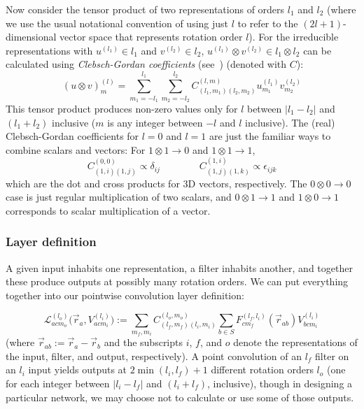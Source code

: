 \documentclass{article}
\begin{document}
Now consider the tensor product of two representations of orders $l_1$ and $l_2$ (where we use the usual notational convention of using just $l$ to refer to the $(2l + 1)$-dimensional vector space that represents rotation order $l$). For the irreducible representations with $u^{(l_1)} \in l_1$ and $v^{(l_2)} \in l_2$, $u^{(l_1)} \otimes v^{(l_2)} \in l_1 \otimes l_2$ can be calculated using {\em Clebsch-Gordan coefficients} (see~\citet{griffiths2016introduction}) (denoted with $C$): 
\[(u \otimes v)^{(l)}_{m} = \sum_{m_1=-l_1}^{l_1} \sum_{m_2=-l_2}^{l_2} C^{(l, m)}_{(l_1, m_1) (l_2, m_2)} u^{(l_1)}_{m_1} v^{(l_2)}_{m_2}\]
This tensor product produces non-zero values only for $l$ between $|l_1 - l_2|$ and $(l_1 + l_2)$ inclusive ($m$ is any integer between $-l$ and $l$ inclusive).  The (real) Clebsch-Gordan coefficients for $l=0$ and $l=1$ are just the familiar ways to combine scalars and vectors: 
For $1\otimes 1 \rightarrow 0$ and $1\otimes 1 \rightarrow 1$,
\[C^{(0,0)}_{(1,i)(1,j)} \propto \delta_{ij} \qquad \qquad
C^{(1,i)}_{(1,j)(1,k)} \propto \epsilon_{ijk}\] which are  the dot and cross products for 3D vectors, respectively.  The $0 \otimes 0 \rightarrow 0$ case is just regular multiplication of two scalars, and $0 \otimes 1 \rightarrow 1$ and $1 \otimes 0 \rightarrow 1$ corresponds to scalar multiplication of a vector.
% 
% 
% 
% 
%

\subsubsection{Layer definition}

A given input inhabits one representation, a filter inhabits another, and together these produce outputs at possibly many rotation orders.
We can put everything together into our pointwise convolution layer definition:

\begin{equation} \label{eq:conv_def}
\mathcal{L}^{(l_o)}_{acm_o}\big(\vec{r}_a, V^{(l_i)}_{acm_i}\big) := \sum_{m_f, m_i} C_{(l_f, m_f) (l_i, m_i)}^{(l_o, m_o)} \sum_{b\in S} F^{(l_f, l_i)}_{c m_f}(\vec{r}_{ab})V^{(l_i)}_{bcm_i}
\end{equation}
(where $\vec{r}_{ab} := \vec{r}_a - \vec{r}_b$ and the subscripts $i$, $f$, and $o$ denote the representations of the input, filter, and output, respectively).  A point convolution of an $l_f$ filter on an $l_i$ input yields outputs at $2\min(l_i, l_f) + 1$ different rotation orders $l_o$ (one for each integer between $|l_i - l_f|$ and $(l_i + l_f)$, inclusive), though in designing a particular network, we may choose not to calculate or use some of those outputs.
\end{document}
